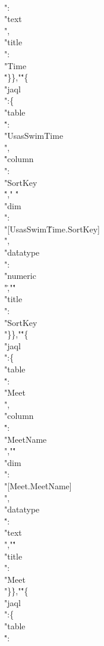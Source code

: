 {\\":\\"text}\)\.{\\",\\"title\\":\\"Time\\}\)\.{"\}\},"}\.{"\{\\"jaql\\":\{%
\\"table\\}\)\.{":\\"UsasSwimTime\\",\\}\)\.{"column\\":\\"SortKey\\}\)\.{","}%
\.{"\\"dim\\":\\"[UsasSwim}\)\.{Time.SortKey]\\",\\"da}\)\.{tatype\\":%
\\"numeric\\"}\)\.{,"}\.{"\\"title\\":\\"SortKey}\)\.{\\"\}\},"}\.{"\{\\"jaql%
\\":\{\\"table\\}\)\.{":\\"Meet\\",\\"column\\}\)\.{":\\"MeetName\\","}\.{"%
\\"dim\\":\\"[Meet.Mee}\)\.{tName]\\",\\"datatype\\}\)\.{":\\"text\\","}\.{"%
\\"title\\":\\"Meet\\"\}}\)\.{\},"}\.{"\{\\"jaql\\":\{\\"table\\}\)\.{":%
}
